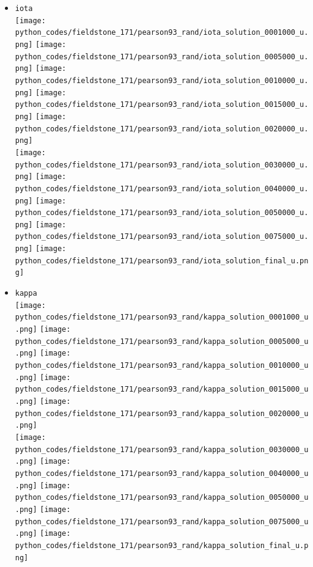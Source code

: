 \begin{itemize}
\item {\tt iota}\\
\texttt{[image: python\_codes/fieldstone\_171/pearson93\_rand/iota\_solution\_0001000\_u.png]}
\texttt{[image: python\_codes/fieldstone\_171/pearson93\_rand/iota\_solution\_0005000\_u.png]}
\texttt{[image: python\_codes/fieldstone\_171/pearson93\_rand/iota\_solution\_0010000\_u.png]}
\texttt{[image: python\_codes/fieldstone\_171/pearson93\_rand/iota\_solution\_0015000\_u.png]}
\texttt{[image: python\_codes/fieldstone\_171/pearson93\_rand/iota\_solution\_0020000\_u.png]}\\
\texttt{[image: python\_codes/fieldstone\_171/pearson93\_rand/iota\_solution\_0030000\_u.png]}
\texttt{[image: python\_codes/fieldstone\_171/pearson93\_rand/iota\_solution\_0040000\_u.png]}
\texttt{[image: python\_codes/fieldstone\_171/pearson93\_rand/iota\_solution\_0050000\_u.png]}
\texttt{[image: python\_codes/fieldstone\_171/pearson93\_rand/iota\_solution\_0075000\_u.png]}
\texttt{[image: python\_codes/fieldstone\_171/pearson93\_rand/iota\_solution\_final\_u.png]}


\item {\tt kappa}\\
\texttt{[image: python\_codes/fieldstone\_171/pearson93\_rand/kappa\_solution\_0001000\_u.png]}
\texttt{[image: python\_codes/fieldstone\_171/pearson93\_rand/kappa\_solution\_0005000\_u.png]}
\texttt{[image: python\_codes/fieldstone\_171/pearson93\_rand/kappa\_solution\_0010000\_u.png]}
\texttt{[image: python\_codes/fieldstone\_171/pearson93\_rand/kappa\_solution\_0015000\_u.png]}
\texttt{[image: python\_codes/fieldstone\_171/pearson93\_rand/kappa\_solution\_0020000\_u.png]}\\
\texttt{[image: python\_codes/fieldstone\_171/pearson93\_rand/kappa\_solution\_0030000\_u.png]}
\texttt{[image: python\_codes/fieldstone\_171/pearson93\_rand/kappa\_solution\_0040000\_u.png]}
\texttt{[image: python\_codes/fieldstone\_171/pearson93\_rand/kappa\_solution\_0050000\_u.png]}
\texttt{[image: python\_codes/fieldstone\_171/pearson93\_rand/kappa\_solution\_0075000\_u.png]}
\texttt{[image: python\_codes/fieldstone\_171/pearson93\_rand/kappa\_solution\_final\_u.png]}


\end{itemize}
